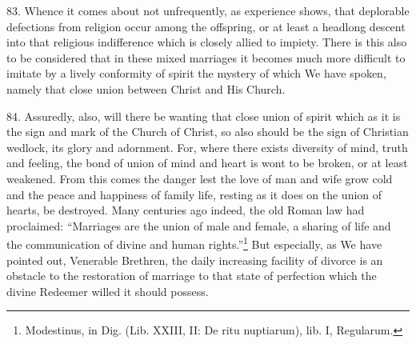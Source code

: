\documentclass[12pt,a4paper]{book}
\begin{document}
83. Whence it comes about not unfrequently, as experience shows, that deplorable defections from religion occur among the offspring, or at least a headlong descent into that religious indifference which is closely allied to impiety. There is this also to be considered that in these mixed marriages it becomes much more difficult to imitate by a lively conformity of spirit the mystery of which We have spoken, namely that close union between Christ and His Church.

84. Assuredly, also, will there be wanting that close union of spirit which as it is the sign and mark of the Church of Christ, so also should be the sign of Christian wedlock, its glory and adornment. For, where there exists diversity of mind, truth and feeling, the bond of union of mind and heart is wont to be broken, or at least weakened. From this comes the danger lest the love of man and wife grow cold and the peace and happiness of family life, resting as it does on the union of hearts, be destroyed. Many centuries ago indeed, the old Roman law had proclaimed: ``Marriages are the union of male and female, a sharing of life and the communication of divine and human rights.''\footnote{Modestinus, in Dig. (Lib. XXIII, II: De ritu nuptiarum), lib. I, Regularum.} But especially, as We have pointed out, Venerable Brethren, the daily increasing facility of divorce is an obstacle to the restoration of marriage to that state of perfection which the divine Redeemer willed it should possess.
\end{document}
